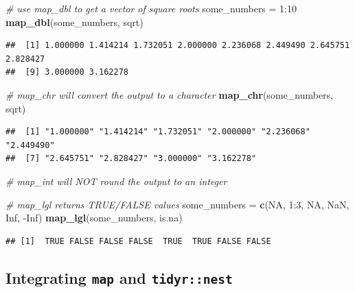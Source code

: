 \documentclass[]{book}
\newenvironment{Shaded}{}{}
\newcommand{\CommentTok}[1]{\textcolor[rgb]{0.38,0.63,0.69}{\textit{#1}}}
\newcommand{\DecValTok}[1]{\textcolor[rgb]{0.25,0.63,0.44}{#1}}
\newcommand{\KeywordTok}[1]{\textcolor[rgb]{0.00,0.44,0.13}{\textbf{#1}}}
\newcommand{\NormalTok}[1]{#1}
\newcommand{\OperatorTok}[1]{\textcolor[rgb]{0.40,0.40,0.40}{#1}}
\newcommand{\OtherTok}[1]{\textcolor[rgb]{0.00,0.44,0.13}{#1}}
\newcommand{\StringTok}[1]{\textcolor[rgb]{0.25,0.44,0.63}{#1}}
\begin{document}
\begin{Shaded}
\begin{Highlighting}[]
\CommentTok{# use map_dbl to get a vector of square roots}
\NormalTok{some_numbers =}\StringTok{ }\DecValTok{1}\OperatorTok{:}\DecValTok{10}
\KeywordTok{map_dbl}\NormalTok{(some_numbers, sqrt)}
\end{Highlighting}
\end{Shaded}

\begin{verbatim}
##  [1] 1.000000 1.414214 1.732051 2.000000 2.236068 2.449490 2.645751 2.828427
##  [9] 3.000000 3.162278
\end{verbatim}

\begin{Shaded}
\begin{Highlighting}[]
\CommentTok{# map_chr will convert the output to a character}
\KeywordTok{map_chr}\NormalTok{(some_numbers, sqrt)}
\end{Highlighting}
\end{Shaded}

\begin{verbatim}
##  [1] "1.000000" "1.414214" "1.732051" "2.000000" "2.236068" "2.449490"
##  [7] "2.645751" "2.828427" "3.000000" "3.162278"
\end{verbatim}

\begin{Shaded}
\begin{Highlighting}[]
\CommentTok{# map_int will NOT round the output to an integer}

\CommentTok{# map_lgl returns TRUE/FALSE values}
\NormalTok{some_numbers =}\StringTok{ }\KeywordTok{c}\NormalTok{(}\OtherTok{NA}\NormalTok{, }\DecValTok{1}\OperatorTok{:}\DecValTok{3}\NormalTok{, }\OtherTok{NA}\NormalTok{, }\OtherTok{NaN}\NormalTok{, }\OtherTok{Inf}\NormalTok{, }\OperatorTok{-}\OtherTok{Inf}\NormalTok{)}
\KeywordTok{map_lgl}\NormalTok{(some_numbers, is.na)}
\end{Highlighting}
\end{Shaded}

\begin{verbatim}
## [1]  TRUE FALSE FALSE FALSE  TRUE  TRUE FALSE FALSE
\end{verbatim}

\hypertarget{integrating-map-and-tidyrnest}{%
\subsection*{\texorpdfstring{Integrating \texttt{map} and \texttt{tidyr::nest}}{Integrating map and tidyr::nest}}\label{integrating-map-and-tidyrnest}}
\end{document}
